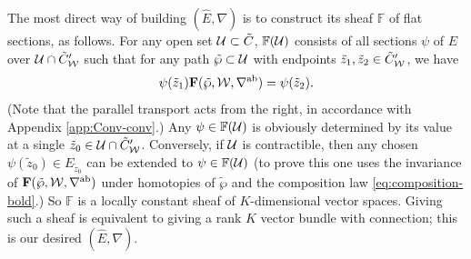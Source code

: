 \documentclass[11pt,a4paper]{article}
\def\wnet {{\cal W}}
\def\CU{{\cal U}}
\def\ab{{\mathrm{ab}}}
\def\tz{{\tilde z}}
\def\bF{\mathbf{F}}
\def\wnet {{\cal W}}
\def\CU{{\cal U}}
\begin{document}
The most direct way of building $({\hat E}, \nabla)$ is to construct its
sheaf ${\mathbb F}$ of flat sections, as follows.  For
any open set $\CU \subset \tilde C$, ${\mathbb F}(\CU)$ consists of all sections $\psi$
of $E$ over $\CU \cap \tilde C'_\wnet$ such that
for any path $\tilde \wp \subset \CU$
with endpoints $\tz_1, \tz_2 \in \tilde C'_\wnet$, we have
\begin{equation}
\psi(\tz_1) \bF(\tilde \wp, \wnet, \nabla^\ab) = \psi(\tz_2).
\end{equation}
(Note that the parallel transport acts from the right, in accordance
with Appendix \ref{app:Conv-conv}.)
Any $\psi \in {\mathbb F}(\CU)$ is obviously determined by its value at a single
$\tz_0 \in \CU \cap \tilde C'_\wnet$.  Conversely,
if $\CU$ is contractible, then any chosen $\psi(\tz_0) \in E_{\tz_0}$ can
be extended to $\psi \in {\mathbb F}(\CU)$ (to prove this one uses
the invariance of $\bF(\tilde \wp, \wnet, \nabla^\ab)$ under homotopies of $\tilde \wp$
and the composition law \eqref{eq:composition-bold}.)
So $\mathbb F$ is a locally constant sheaf of $K$-dimensional vector spaces.
Giving such a sheaf is equivalent to giving a rank $K$ vector bundle with
connection; this is our desired $({\hat E}, \nabla)$.
\end{document}
